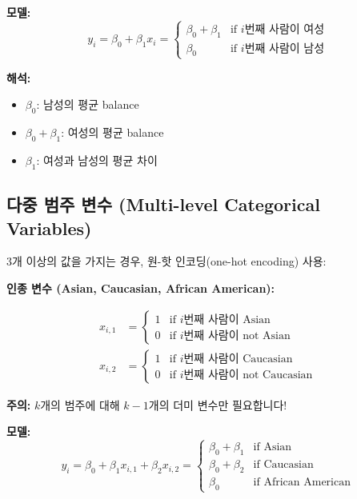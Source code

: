 \documentclass[12pt]{article}
\begin{document}
\textbf{모델:}
\begin{equation}
y_i = \beta_0 + \beta_1 x_i = \begin{cases}
\beta_0 + \beta_1 & \text{if } i\text{번째 사람이 여성} \\
\beta_0 & \text{if } i\text{번째 사람이 남성}
\end{cases}
\end{equation}

\textbf{해석:}
\begin{itemize}
    \item $\beta_0$: 남성의 평균 balance
    \item $\beta_0 + \beta_1$: 여성의 평균 balance
    \item $\beta_1$: 여성과 남성의 평균 차이
\end{itemize}

\subsection{다중 범주 변수 (Multi-level Categorical Variables)}

3개 이상의 값을 가지는 경우, 원-핫 인코딩(one-hot encoding) 사용:

\textbf{인종 변수 (Asian, Caucasian, African American):}

\begin{align}
x_{i,1} &= \begin{cases}
1 & \text{if } i\text{번째 사람이 Asian} \\
0 & \text{if } i\text{번째 사람이 not Asian}
\end{cases} \\
x_{i,2} &= \begin{cases}
1 & \text{if } i\text{번째 사람이 Caucasian} \\
0 & \text{if } i\text{번째 사람이 not Caucasian}
\end{cases}
\end{align}

\textbf{주의:} $k$개의 범주에 대해 $k-1$개의 더미 변수만 필요합니다!

\textbf{모델:}
\begin{equation}
y_i = \beta_0 + \beta_1 x_{i,1} + \beta_2 x_{i,2} = \begin{cases}
\beta_0 + \beta_1 & \text{if Asian} \\
\beta_0 + \beta_2 & \text{if Caucasian} \\
\beta_0 & \text{if African American}
\end{cases}
\end{equation}
\end{document}
